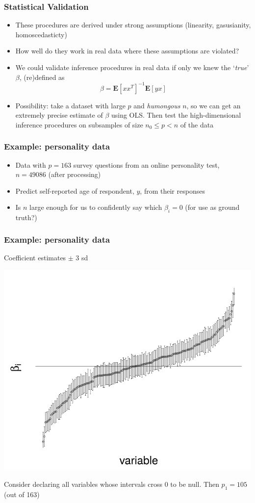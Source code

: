 \documentclass{beamer}
\newcommand{\E}{\textbf{E}}
\begin{document}
\begin{frame}
\frametitle{Statistical Validation}
\begin{itemize}
\item<1-> These procedures are derived under strong assumptions (linearity, gasusianity, homoscedasticty)
\item<1-> How well do they work in real data where these assumptions are violated?
\item<1-> We could validate inference procedures in real data if only we knew the `\emph{true}' $\beta$, (re)defined as
\[
\beta = \E[x x^T]^{-1} \E[yx]
\]
\item<2-> Possibility: take a dataset with large $p$ and
  \emph{humongous} $n$, so we can get an extremely precise estimate of
  $\beta$ using OLS. Then test the high-dimensional inference
  procedures on subsamples of size $n_0 \leq p < n$ of the data
\end{itemize}
\end{frame}

\begin{frame}
\frametitle{Example: personality data}
\begin{itemize}
\item Data with $p = 163$ survey questions from an online personality test, $n = 49086$ (after processing)
\item Predict self-reported age of respondent, $y$, from their responses
\item Is $n$ large enough for us to confidently say which $\beta_i = 0$ (for use as ground truth?)
\end{itemize}
\end{frame}

\begin{frame}
\frametitle{Example: personality data}
Coefficient estimates $\pm$ 3 sd
\begin{center}
\includegraphics[scale = 0.2]{pf16_coefs.png}
\end{center}
Consider declaring all variables whose intervals cross 0 to be null.
Then $p_1 = 105$ (out of 163)
\end{frame}
\end{document}
